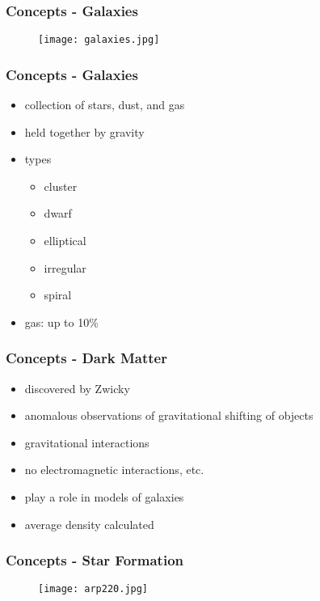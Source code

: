\documentclass{beamer}
\begin{document}
\begin{frame}
  \frametitle{Concepts - Galaxies}
  \begin{figure}
    \texttt{[image: galaxies.jpg]}
  \end{figure}
\end{frame}

\begin{frame}
  \frametitle{Concepts - Galaxies}
  \begin{itemize}
    \item collection of stars, dust, and gas
    \item held together by gravity
    \item types
    \begin{itemize}
      \item cluster
      \item dwarf
      \item elliptical
      \item irregular
      \item spiral
    \end{itemize}
    \item gas: up to 10\%
  \end{itemize}
\end{frame}

\begin{frame}
  \frametitle{Concepts - Dark Matter}
  \begin{itemize}
    \item discovered by Zwicky
    \item anomalous observations of gravitational shifting of objects
    \item gravitational interactions
    \item no electromagnetic interactions, etc.
    \item play a role in models of galaxies
    \item average density calculated
  \end{itemize}
\end{frame}

\begin{frame}
  \frametitle{Concepts - Star Formation}
  \begin{figure}
    \texttt{[image: arp220.jpg]}
  \end{figure}
\end{frame}
\end{document}
